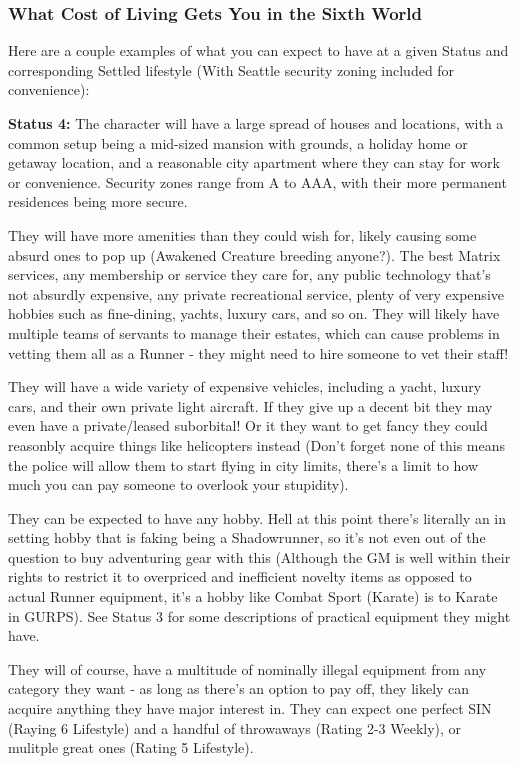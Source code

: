 \begin{multicols*}{2}
	\subsubsection*{What Cost of Living Gets You in the Sixth World}
	
	Here are a couple examples of what you can expect to have at a given Status and corresponding Settled lifestyle (With Seattle security zoning included for convenience):
	
	\textbf{Status 4:} The character will have a large spread of houses and locations, with a common setup being a mid-sized mansion with grounds, a holiday home or getaway location, and a reasonable city apartment where they can stay for work or convenience. Security zones range from A to AAA, with their more permanent residences being more secure. 
	
	They will have more amenities than they could wish for, likely causing some absurd ones to pop up (Awakened Creature breeding anyone?). The best Matrix services, any membership or service they care for, any public technology that's not absurdly expensive, any private recreational service, plenty of very expensive hobbies such as fine-dining, yachts, luxury cars, and so on. They will likely have multiple teams of servants to manage their estates, which can cause problems in vetting them all as a Runner - they might need to hire someone to vet their staff! 
	
	They will have a wide variety of expensive vehicles, including a yacht, luxury cars, and their own private light aircraft. If they give up a decent bit they may even have a private/leased suborbital! Or it they want to get fancy they could reasonbly acquire things like helicopters instead (Don't forget none of this means the police will allow them to start flying in city limits, there's a limit to how much you can pay someone to overlook your stupidity).
	
	They can be expected to have any hobby. Hell at this point there's literally an in setting hobby that is faking being a Shadowrunner, so it's not even out of the question to buy adventuring gear with this (Although the GM is well within their rights to restrict it to overpriced and inefficient novelty items as opposed to actual Runner equipment, it's a hobby like Combat Sport (Karate) is to Karate in GURPS). See Status 3 for some descriptions of practical equipment they might have. 
	
	They will of course, have a multitude of nominally illegal equipment from any category they want - as long as there's an option to pay off, they likely can acquire anything they have major interest in. They can expect one perfect SIN (Raying 6 Lifestyle) and a handful of throwaways (Rating 2-3 Weekly), or mulitple great ones (Rating 5 Lifestyle).
	

\end{multicols*}
